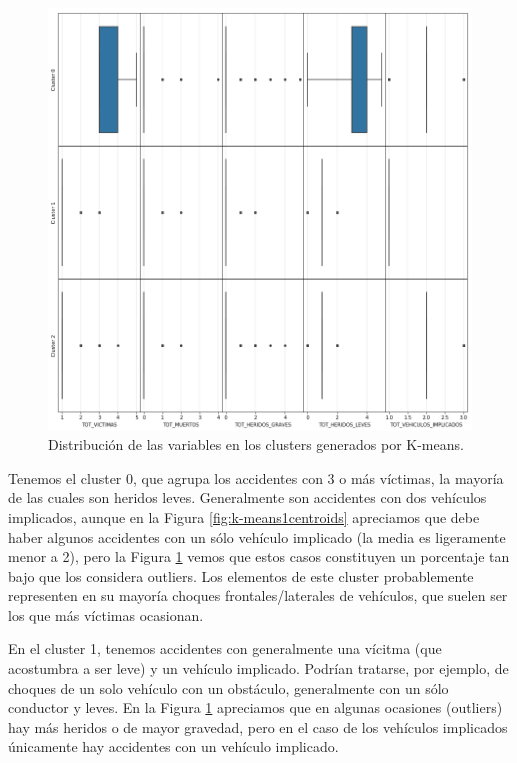 \documentclass[oneside]{book}
\begin{document}
\begin{figure}[H]
  \centering
  \includegraphics[width=130mm]{figures/accidentes/k-means1distribution}
  \caption{Distribución de las variables en los clusters generados por
    K-means.}
  \label{fig:k-means1distribution}
\end{figure}


Tenemos el cluster 0, que agrupa los accidentes con 3 o más víctimas,
la mayoría de las cuales son heridos leves. Generalmente son
accidentes con dos vehículos implicados, aunque en la Figura
\ref{fig:k-means1centroids} apreciamos que debe haber algunos
accidentes con un sólo vehículo implicado (la media es ligeramente
menor a 2), pero la Figura \ref{fig:k-means1distribution} vemos que
estos casos constituyen un porcentaje tan bajo que los considera
outliers. Los elementos de este cluster probablemente representen en
su mayoría choques frontales/laterales de vehículos, que suelen ser
los que más víctimas ocasionan.

En el cluster 1, tenemos accidentes con generalmente una vícitma (que
acostumbra a ser leve) y un vehículo implicado. Podrían tratarse, por
ejemplo, de choques de un solo vehículo con un obstáculo, generalmente
con un sólo conductor y leves. En la Figura
\ref{fig:k-means1distribution} apreciamos que en algunas ocasiones
(outliers) hay más heridos o de mayor gravedad, pero en el caso de los
vehículos implicados únicamente hay accidentes con un vehículo
implicado.
\end{document}

